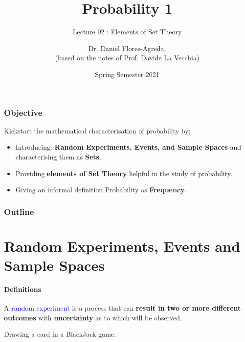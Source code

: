 \documentclass[notes=show]{beamer}\usepackage[]{graphicx}\usepackage[]{color}
\begin{document}
\title[S110015]{Probability 1}
\subtitle{Lecture 02 : Elements of Set Theory}
\author[Flores-Agreda, La Vecchia]{Dr. Daniel Flores-Agreda, \\[0.5em] \tiny{(based on the notes of Prof. Davide La Vecchia)}}
\date{Spring Semester 2021}

\begin{frame}
  \titlepage
\end{frame}


\begin{frame}
\frametitle{Objective}
  Kickstart the mathematical characterisation of probability by:\\[1.5em]
  \begin{itemize}
  \item Introducing: \textbf{Random Experiments, Events, and Sample Spaces} and characterising them as \textbf{Sets}.\\[1em]
  \item Providing \textbf{elements of Set Theory} helpful in the study of probability.\\[1em]
  \item Giving an informal definition Probability as \textbf{Frequency}.
  \end{itemize}
\end{frame}

\begin{frame}
\frametitle{Outline}
\tableofcontents
\end{frame}

\section{Random Experiments, Events and Sample Spaces}

\begin{frame}{\secname}
\framesubtitle{Definitions}
  \begin{definition}
  A \textcolor{blue}{random experiment} is a process that can \textbf{result in two or more different outcomes} with \textbf{uncertainty} as to which will be observed.
  \end{definition}
  \pause
  \begin{example}
    \begin{center}
    Drawing a card in a BlackJack game.
    \end{center}
  \end{example}
\end{frame}
\end{document}
